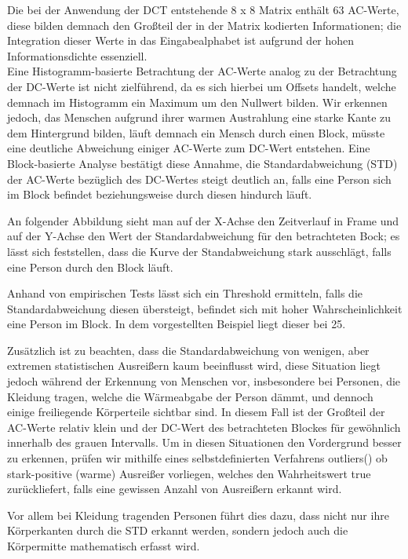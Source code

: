 Die bei der Anwendung der DCT entstehende 8 x 8 Matrix enthält 63 AC-Werte, diese bilden demnach den Großteil der in der Matrix kodierten Informationen; die Integration dieser Werte in das Eingabealphabet ist aufgrund der hohen Informationsdichte essenziell.\\
Eine Histogramm-basierte Betrachtung der AC-Werte analog zu der Betrachtung der DC-Werte ist nicht zielführend, da es sich hierbei um Offsets handelt, welche demnach im Histogramm ein Maximum um den Nullwert bilden.
Wir erkennen jedoch, das Menschen aufgrund ihrer warmen Austrahlung eine starke Kante zu dem Hintergrund bilden, läuft demnach ein Mensch durch einen Block, müsste eine deutliche Abweichung einiger AC-Werte zum DC-Wert entstehen.
Eine Block-basierte Analyse bestätigt diese Annahme, die Standardabweichung (STD) der AC-Werte bezüglich des DC-Wertes steigt deutlich an, falls eine Person sich im Block befindet beziehungsweise durch diesen hindurch läuft.


An folgender Abbildung sieht man auf der X-Achse den Zeitverlauf in Frame und auf der Y-Achse den Wert der Standardabweichung für den betrachteten Bock; es lässt sich feststellen, dass die Kurve der Standabweichung stark ausschlägt, falls eine Person durch den Block läuft.

Anhand von empirischen Tests lässt sich ein Threshold ermitteln, falls die Standardabweichung diesen übersteigt, befindet sich mit hoher Wahrscheinlichkeit eine Person im Block.
 In dem vorgestellten Beispiel liegt dieser bei 25.


Zusätzlich ist zu beachten, dass die Standardabweichung von wenigen, aber extremen statistischen Ausreißern kaum beeinflusst wird, diese Situation liegt  jedoch während der Erkennung von Menschen vor, insbesondere bei Personen, die Kleidung tragen, welche die Wärmeabgabe der Person dämmt, und dennoch einige freiliegende Körperteile sichtbar sind.
 In diesem Fall ist der Großteil der AC-Werte relativ klein und der DC-Wert des betrachteten Blockes für gewöhnlich innerhalb des grauen Intervalls.
 Um in diesen Situationen den Vordergrund besser zu erkennen, prüfen wir mithilfe eines selbstdefinierten Verfahrens outliers() ob stark-positive (warme) Ausreißer vorliegen, welches den Wahrheitswert true zurückliefert, falls eine gewissen Anzahl von Ausreißern erkannt wird.


Vor allem bei Kleidung tragenden Personen führt dies dazu, dass nicht nur ihre Körperkanten durch die STD erkannt werden, sondern jedoch auch die Körpermitte mathematisch erfasst wird.



